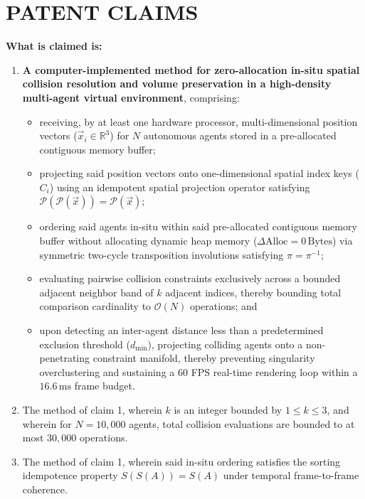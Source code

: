 \documentclass[11pt,a4paper]{article}
\begin{document}
\section*{PATENT CLAIMS}
\textbf{What is claimed is:}

\begin{enumerate}
    \item \textbf{A computer-implemented method for zero-allocation in-situ spatial collision resolution and volume preservation in a high-density multi-agent virtual environment}, comprising:
    \begin{itemize}
        \item receiving, by at least one hardware processor, multi-dimensional position vectors ($\vec{x}_i \in \mathbb{R}^3$) for $N$ autonomous agents stored in a pre-allocated contiguous memory buffer;
        \item projecting said position vectors onto one-dimensional spatial index keys ($C_i$) using an idempotent spatial projection operator satisfying $\mathcal{P}(\mathcal{P}(\vec{x})) = \mathcal{P}(\vec{x})$;
        \item ordering said agents in-situ within said pre-allocated contiguous memory buffer without allocating dynamic heap memory ($\Delta\text{Alloc} = 0\,\text{Bytes}$) via symmetric two-cycle transposition involutions satisfying $\pi = \pi^{-1}$;
        \item evaluating pairwise collision constraints exclusively across a bounded adjacent neighbor band of $k$ adjacent indices, thereby bounding total comparison cardinality to $\mathcal{O}(N)$ operations; and
        \item upon detecting an inter-agent distance less than a predetermined exclusion threshold ($d_{\min}$), projecting colliding agents onto a non-penetrating constraint manifold, thereby preventing singularity overclustering and sustaining a 60 FPS real-time rendering loop within a $16.6\,\text{ms}$ frame budget.
    \end{itemize}

    \item The method of claim 1, wherein $k$ is an integer bounded by $1 \le k \le 3$, and wherein for $N = 10,000$ agents, total collision evaluations are bounded to at most $30,000$ operations.

    \item The method of claim 1, wherein said in-situ ordering satisfies the sorting idempotence property $S(S(A)) = S(A)$ under temporal frame-to-frame coherence.


\end{enumerate}
\end{document}
